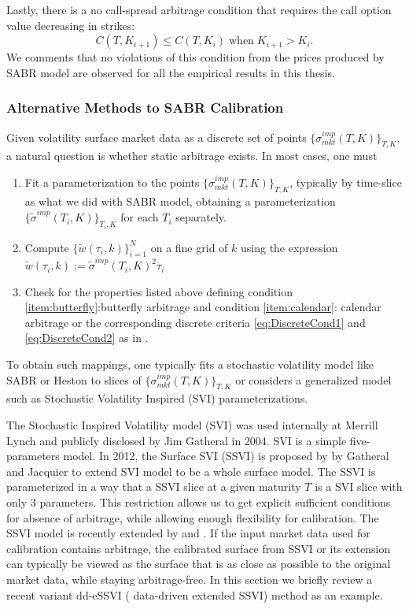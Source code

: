 \documentclass[letterpaper,12pt,titlepage,oneside,final]{book}
\numberwithin{equation}{section}
\theoremstyle{definition}
\begin{document}
 Lastly, there is a no call-spread arbitrage condition that requires the call option value decreasing in strikes:
 \[
	C(T,K_{i+1})\leq C(T,K_{i}) \; \text{when} \; K_{i+1}>K_{i}.
\]
 We comments that no violations of this condition from the prices produced by SABR model  are observed for all the empirical results in this thesis. 
 \subsubsection{Alternative Methods to SABR Calibration}
 Given volatility surface market data as a discrete set of points $\{ \sigma^{imp}_{mkt}(T,K) \}_{T,K}$, a natural question is whether static arbitrage exists. In most cases, one must 
 \begin{enumerate}
 \item Fit a parameterization to the points $\{ \sigma^{imp}_{mkt}(T,K) \}_{T,K}$, typically by time-slice as what we did with SABR model, obtaining a parameterization $\{ \widetilde{\sigma}^{imp}(T_i,K)   \}_{T_i,K} $ for each $T_i$ separately.
 \item Compute $\{ \widetilde{w}(\tau_i,k) \}_{i=1}^N$ on a fine grid of $k$ using the expression $\widetilde{w}(\tau_i,k) := \widetilde{\sigma}^{imp}(T_i,K)^2 \tau_i$   
 \item Check for the properties listed above defining condition \ref{item:butterfly}:butterfly arbitrage and condition \ref{item:calendar}: calendar arbitrage or the corresponding discrete criteria \eqref{eq:DiscreteCond1} and \eqref{eq:DiscreteCond2} as in \cite{carr2005note}. 
 \end{enumerate}
 To obtain such mappings, one typically fits a stochastic volatility model like SABR or Heston to slices of $\{\sigma^{imp}_{mkt}(T,K)\}_{T,K}$ or considers a generalized model such as Stochastic Volatility Inspired (SVI) parameterizations.  
 
 The Stochastic Inspired Volatility model (SVI) \cite{gatheral2004parsimonious} was used internally at Merrill Lynch and publicly disclosed by Jim Gatheral in 2004.  SVI is a simple  five-parameters model.  In 2012,  the Surface SVI (SSVI) \cite{gatheral2014arbitrage} is proposed by by Gatheral and Jacquier to extend SVI model to be a whole surface model. The SSVI is parameterized in a way that a  SSVI slice at a given maturity $T$ is a SVI slice with only 3 parameters. This restriction allows us to get explicit sufficient conditions for absence of arbitrage, while allowing enough flexibility for calibration. The SSVI model is recently extended by \cite{hendriks2017extended} and \cite{corbetta2019robust}. If the input market data used for calibration contains arbitrage, the calibrated surface from SSVI \cite{gatheral2014arbitrage} or its extension \cite{hendriks2017extended,corbetta2019robust} can typically be viewed as the surface that is as close as possible to the original market data, while staying arbitrage-free. In this section we briefly review a recent variant dd-eSSVI ( data-driven extended SSVI) method \cite{corbetta2019robust} as an example.
 
\end{document}
